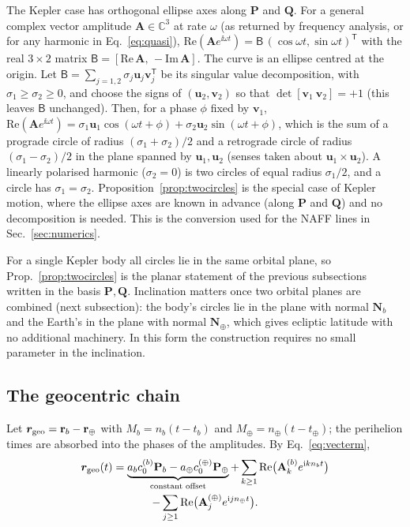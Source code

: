 The Kepler case has orthogonal ellipse axes along $\mathbf P$ and $\mathbf Q$.
For a general complex vector amplitude $\mathbf A\in\mathbb C^3$ at rate
$\omega$ (as returned by frequency analysis, or for any harmonic in
Eq.~\eqref{eq:quasi}), $\mathrm{Re}(\mathbf Ae^{\ii\omega t})=\mathsf B\,
(\cos\omega t,\sin\omega t)^{\mathsf T}$ with the real $3\times2$ matrix
$\mathsf B=[\mathrm{Re}\,\mathbf A,\,-\mathrm{Im}\,\mathbf A]$. The curve is
an ellipse centred at the origin. Let $\mathsf B=\sum_{j=1,2}\sigma_j\mathbf u_j
\mathbf v_j^{\mathsf T}$ be its singular value decomposition, with
$\sigma_1\ge\sigma_2\ge0$, and choose the signs of $(\mathbf u_2,\mathbf v_2)$
so that $\det[\mathbf v_1\ \mathbf v_2]=+1$ (this leaves $\mathsf B$
unchanged). Then, for a phase $\phi$ fixed by $\mathbf v_1$,
$\mathrm{Re}(\mathbf Ae^{\ii\omega t})=\sigma_1\mathbf u_1\cos(\omega t+\phi)
+\sigma_2\mathbf u_2\sin(\omega t+\phi)$, which is the sum of a prograde circle
of radius $(\sigma_1+\sigma_2)/2$ and a retrograde circle of radius
$(\sigma_1-\sigma_2)/2$ in the plane spanned by $\mathbf u_1,\mathbf u_2$
(senses taken about $\mathbf u_1\times\mathbf u_2$). A linearly polarised
harmonic ($\sigma_2=0$) is two circles of equal radius $\sigma_1/2$, and a
circle has $\sigma_1=\sigma_2$. Proposition~\ref{prop:twocircles} is the
special case of Kepler motion, where the ellipse axes are known in advance (along
$\mathbf P$ and $\mathbf Q$) and no decomposition is needed. This is the conversion used for the NAFF lines in
Sec.~\ref{sec:numerics}.

For a single Kepler body all circles lie in the same orbital plane, so
Prop.~\ref{prop:twocircles} is the planar statement of the previous
subsections written in the basis $\mathbf P,\mathbf Q$. Inclination matters
once two orbital planes are combined (next subsection): the body's circles
lie in the plane with normal $\mathbf N_b$ and the Earth's in the plane with
normal $\mathbf N_\oplus$, which gives ecliptic latitude with no additional
machinery. In this form the construction requires no small parameter in the
inclination.

\subsection{The geocentric chain}
\label{sec:th-geo}

Let $\bm{r}_{\mathrm{geo}}=\mathbf r_b-\mathbf r_\oplus$ with $M_b=n_b(t-t_b)$ and
$M_\oplus=n_\oplus(t-t_\oplus)$; the perihelion times are absorbed into the
phases of the amplitudes. By Eq.~\eqref{eq:vecterm},
\begin{multline}
\bm{r}_{\mathrm{geo}}(t)=\underbrace{a_bc_0^{(b)}\mathbf P_b-a_\oplus c_0^{(\oplus)}\mathbf P_\oplus}_{\text{constant offset}}
+\sum_{k\ge1}\mathrm{Re}\big(\mathbf A^{(b)}_ke^{\mathrm{i} kn_bt}\big)\\
-\sum_{j\ge1}\mathrm{Re}\big(\mathbf A^{(\oplus)}_je^{\mathrm{i} jn_\oplus t}\big).
\label{eq:geo}
\end{multline}

